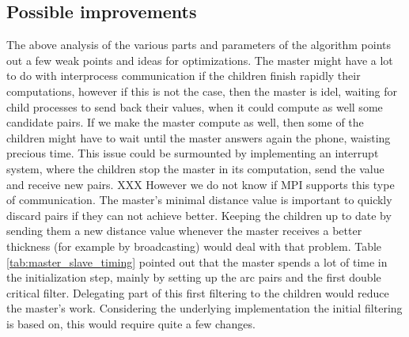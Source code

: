\documentclass{article}
\begin{document}
\begin{comment}
\begin{figure}
\begin{center}
\begin{tabular}{lclll}
knot & data points & master (sec) & children (sec) & total (sec) \\
j3.1 & 512 & 0.165336 & 2.092650 & 2.258000 \\
k3.1 & 160 & 0.016368 & 0.016206 & 0.032578 \\
k4.1 & 208 & 0.024819 & 0.018046 & 0.042868 \\
k5.1 & 232 & 0.031302 & 0.000165 & 0.031471 \\
k6.1 & 280 & 0.042829 & 0.000162 & 0.042995 \\
k7.1 & 304 & 0.052276 & 0.013455 & 0.065735 \\
k8.1 & 352 & 0.067262 & 0.012944 & 0.080209 \\
k9.1 & 376 & 0.067325 & 0.000118 & 0.067447
\end{tabular}
\end{center}
\caption{XXX caption \label{tab:master_slave_timing} }
\end{figure}
\end{comment}

\subsection{Possible improvements}

The above analysis of the various parts and parameters of the algorithm
points out a few weak points and ideas for optimizations. The master might
have a lot to do with interprocess communication if the children finish
rapidly their computations, however if this is not the case, then the
master is idel, waiting for child processes to send back their values,
when it could compute as well some candidate pairs. If we make the master
compute as well, then some of the children might have to wait until the
master answers again the phone, waisting precious time. This issue could
be surmounted by implementing an interrupt system, where the children
stop the master in its computation, send the value and receive new pairs.
XXX However we do not know if MPI supports this type of communication.
The master's minimal distance value is important to quickly discard
pairs if they can not achieve better. Keeping the children up to date
by sending them a new distance value whenever the master receives a
better thickness (for example by broadcasting) would deal with that problem. 
Table \ref{tab:master_slave_timing} pointed out that the master
spends a lot of time in the initialization step, mainly by setting up the
arc pairs and the first double critical filter. Delegating part of this
first filtering to the children would reduce the master's work. Considering
the underlying implementation the initial filtering is based on, this
would require quite a few changes.
\end{document}
